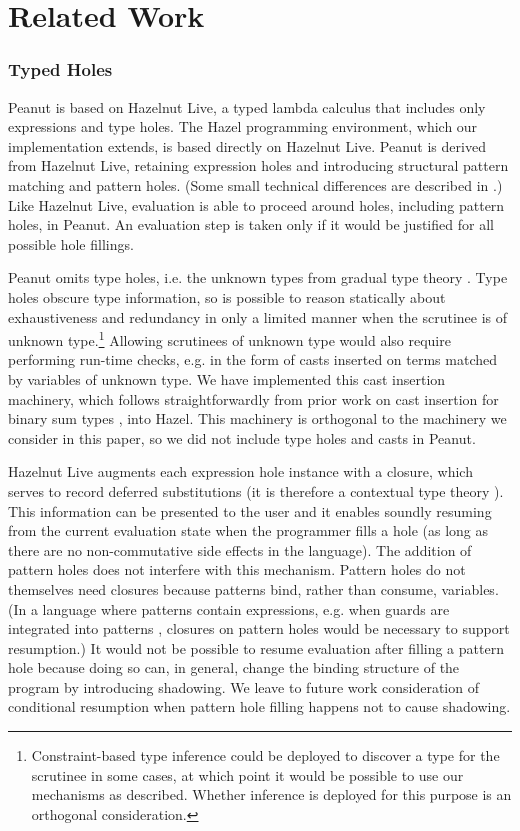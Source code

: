 \section{Related Work}

\subsubsection{Typed Holes}
Peanut is based on Hazelnut Live, a typed lambda calculus that includes only expressions and type holes.
The Hazel programming environment, which our implementation extends, is based directly on Hazelnut Live. 
Peanut is derived from Hazelnut Live, retaining expression holes and introducing  
structural pattern matching and pattern holes. (Some small technical differences are described in .) 
Like Hazelnut Live, evaluation is able to proceed around holes, including pattern holes, in Peanut. An evaluation step is taken 
only if it would be justified for all possible hole fillings.

Peanut omits type holes, i.e. the unknown types from gradual type theory \cite{Siek2006, DBLP:conf/snapl/SiekVCB15}. Type holes obscure type information, so 
is possible to reason statically about exhaustiveness and redundancy in only a limited manner when the scrutinee is of unknown type.\footnote{Constraint-based type inference could be deployed to discover a type for the scrutinee in some cases, at which point it would be possible to use our mechanisms as described. Whether inference is deployed for this purpose is an orthogonal consideration.} Allowing scrutinees of unknown type would also require performing run-time checks, e.g. in the form of casts inserted on terms matched by variables of unknown type. 
We have implemented this cast insertion machinery, which follows straightforwardly from prior work on cast insertion for binary sum types \cite{DBLP:conf/snapl/SiekVCB15}, into Hazel. This machinery is orthogonal to the machinery we consider in this paper, so we did not include type holes and casts in Peanut.

Hazelnut Live augments each expression hole instance with a closure, which serves to record deferred substitutions 
(it is therefore a contextual type theory \cite{DBLP:journals/tocl/NanevskiPP08}). This information can be presented to the user and it enables soundly resuming from the current evaluation state when the programmer fills a hole (as long as there are no non-commutative side effects in the language).
The addition of pattern holes does not interfere with this mechanism. Pattern holes do not themselves need closures because patterns bind,
rather than consume, variables. (In a language where patterns contain expressions, e.g. when guards are integrated into patterns \cite{Reppy2019}, closures on pattern holes would be necessary to support resumption.) It would not be possible to resume evaluation after filling a pattern hole because doing so can, in general, change the binding structure of the program by introducing shadowing. We leave to future work consideration of 
conditional resumption when pattern hole filling happens not to cause shadowing.

